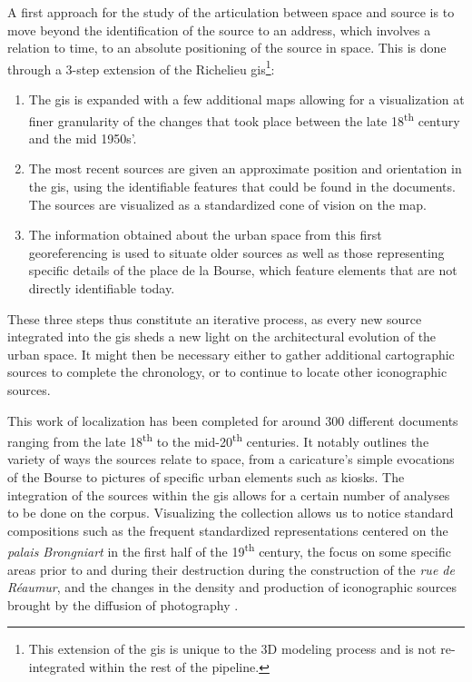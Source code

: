 \documentclass[12pt, a4paper, twocolumn]{article}
\begin{document}
A first approach for the study of the articulation between space and source is  to move beyond the identification of the source to an address, which involves a relation to time, to an absolute positioning of the source in space. This is  done through a 3-step extension of the Richelieu \acs{gis}\footnote{
    This extension of the \acs{gis} is unique to the 3D modeling process and is not re-integrated within the rest of the pipeline.
}:

\begin{enumerate}
    \item The \acs{gis} is  expanded with a few additional maps allowing for a visualization at finer granularity of the changes that took place between the late 18\textsuperscript{th} century and the mid 1950s'.
    \item The most recent sources are  given an approximate position and orientation in the \acs{gis}, using the identifiable features that could be found in the documents. The sources are  visualized as a standardized cone of vision on the map.
    \item The information obtained about the urban space from this first georeferencing is  used to situate older sources as well as those representing specific details of the place de la Bourse, which feature elements that are not  directly identifiable today.
\end{enumerate}

These three steps thus constitute an iterative process, as every new source integrated into the \acs{gis} sheds a new light on the architectural evolution of the urban space. It might then be necessary either to gather additional cartographic sources to complete the chronology, or  to continue to locate other iconographic sources.

This work of localization has been completed for around 300 different documents ranging from the late 18\textsuperscript{th} to the mid-20\textsuperscript{th} centuries. It notably outlines the variety of ways the sources relate to space, from a caricature's simple evocations of the Bourse to pictures of specific urban elements such as kiosks. The integration of the sources within the \acs{gis} allows for a certain number of analyses to be done on the corpus. Visualizing the collection allows us to notice standard compositions such as the frequent standardized representations centered on the \textit{palais Brongniart} in the first half of the 19\textsuperscript{th} century, the focus on some specific areas prior to and during their destruction during the construction of the \textit{rue de Réaumur}, and the changes in the density and production of iconographic sources brought by the diffusion of photography \parencite{mendibilDispositifFormatPosture2008}.
\end{document}
